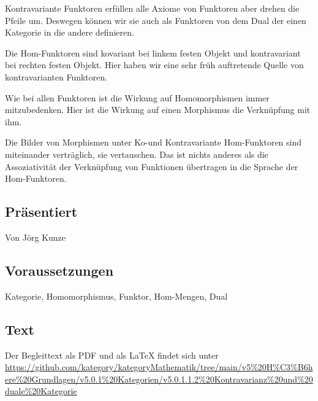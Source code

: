 \documentclass[a4paper]{amsart}
\theoremstyle{definition}
\begin{document}
Kontravariante Funktoren erfüllen alle Axiome von Funktoren aber drehen die Pfeile um. Deswegen können wir sie auch als Funktoren von dem Dual der einen Kategorie in die andere definieren.

Die Hom-Funktoren sind kovariant bei linkem festen Objekt und kontravariant bei rechten festen Objekt. Hier haben wir eine sehr früh auftretende Quelle von kontravarianten Funktoren.

Wie bei allen Funktoren ist die Wirkung auf Homomorphismen immer mitzubedenken. Hier ist die Wirkung auf einen Morphismus die Verknüpfung mit ihm.

Die Bilder von Morphismen unter Ko-und Kontravariante Hom-Funktoren sind miteinander verträglich, sie vertauschen. Das ist nichts anderes als die Assoziativität der Verknüpfung von Funktionen übertragen in die Sprache der Hom-Funktoren.

\subsection*{Präsentiert}
Von Jörg Kunze

\subsection*{Voraussetzungen}
Kategorie, Homomorphismus, Funktor, Hom-Mengen, Dual

\subsection*{Text}
Der Begleittext als PDF und als LaTeX findet sich unter
{\tiny
   \url{https://github.com/kategory/kategoryMathematik/tree/main/v5%20H%C3%B6here%20Grundlagen/v5.0.1%20Kategorien/v5.0.1.1.2%20Kontravarianz%20und%20duale%20Kategorie}
}

\end{document}
